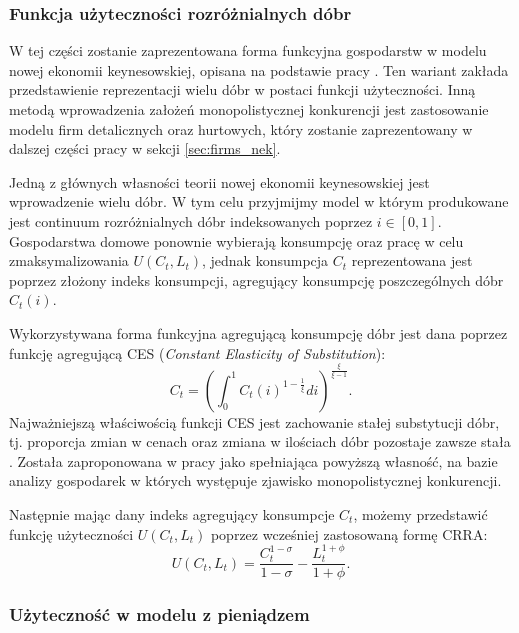 \subsubsection{Funkcja użyteczności rozróżnialnych dóbr}

W tej części zostanie zaprezentowana forma funkcyjna gospodarstw w modelu nowej ekonomii keynesowskiej, opisana na podstawie pracy \cite{gali}. Ten wariant zakłada przedstawienie reprezentacji wielu dóbr w postaci funkcji użyteczności. Inną metodą wprowadzenia założeń monopolistycznej konkurencji jest zastosowanie modelu firm detalicznych oraz hurtowych, który zostanie zaprezentowany w dalszej części pracy w sekcji \ref{sec:firms_nek}.

Jedną z głównych własności teorii nowej ekonomii keynesowskiej jest wprowadzenie wielu dóbr. W tym celu przyjmijmy model w którym produkowane jest continuum rozróżnialnych dóbr indeksowanych poprzez $i \in [0,1]$. Gospodarstwa domowe ponownie wybierają konsumpcję oraz pracę w celu zmaksymalizowania $U(C_t, L_t)$, jednak konsumpcja $C_t$ reprezentowana jest poprzez złożony indeks konsumpcji, agregujący konsumpcję poszczególnych dóbr $C_t(i)$.

Wykorzystywana forma funkcyjna agregującą konsumpcję dóbr jest dana poprzez funkcję agregującą CES (\emph{Constant Elasticity of Substitution}):
\begin{equation}
    \label{eqn:CES}
    C_t = \left(\int^1_0 C_t(i)^{1-\frac{1}{\xi}}di\right)^{\frac{\xi}{\xi - 1}}.
\end{equation}
Najważniejszą właściwością funkcji CES jest zachowanie stałej substytucji dóbr, tj. proporcja zmian w cenach oraz zmiana w ilościach dóbr pozostaje zawsze stała \cite{mcFadden}. Została zaproponowana w pracy \cite{stiglitzCES} jako spełniająca powyższą własność, na bazie analizy gospodarek w których występuje zjawisko monopolistycznej konkurencji.

Następnie mając dany indeks agregujący konsumpcje $C_t$, możemy przedstawić funkcję użyteczności $U(C_t, L_t)$ poprzez wcześniej zastosowaną formę CRRA:
\begin{equation*}
    U(C_t, L_t) =  \frac{C^{1-\sigma}_t}{1 - \sigma} - \frac{L_t^{1+\phi}}{1+\phi}.
\end{equation*}

\subsubsection{Użyteczność w modelu z pieniądzem}


